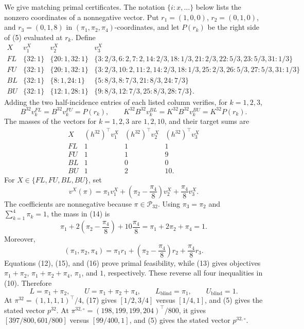 We give matching primal certificates.  The notation \(\{i:x,\ldots\}\) below lists the nonzero coordinates of a nonnegative vector.  Put \(r_1=(1,0,0)\), \(r_2=(0,1,0)\), and \(r_3=(0,1,8)\) in \((\pi_1,\pi_2,\pi_4)\)-coordinates, and let \(P(r_k)\) be the right side of (5) evaluated at \(r_k\).  Define
\[
\begin{array}{c|c|c|l}
X&v_1^X&v_2^X&v_3^X\\\hline
FL&\{32:1\}&\{20:1,32:1\}&
\{3:2/3,6:2,7:2,14:2/3,18:1/3,21:2/3,22:5/3,23:5/3,31:1/3\}\\
FU&\{32:1\}&\{20:1,32:1\}&
\{3:2/3,10:2,11:2,14:2/3,18:1/3,25:2/3,26:5/3,27:5/3,31:1/3\}\\
BL&\{32:1\}&\{8:1,24:1\}&
\{5:8/3,8:7/3,21:8/3,24:7/3\}\\
BU&\{32:1\}&\{12:1,28:1\}&
\{9:8/3,12:7/3,25:8/3,28:7/3\}.
\end{array}
\tag{11}
\]
Adding the two half-incidence entries of each listed column verifies, for \(k=1,2,3\),
\[
B^{32}v_k^{FL}=B^{32}v_k^{FU}=P(r_k),
\qquad
K^{32}B^{32}v_k^{BL}=K^{32}B^{32}v_k^{BU}=K^{32}P(r_k).
\tag{12}
\]
The masses of the vectors for \(k=1,2,3\) are \(1,2,10\), and their target sums are
\[
\begin{array}{c|ccc}
X&(h^{32})^{\top}v_1^X&(h^{32})^{\top}v_2^X&(h^{32})^{\top}v_3^X\\\hline
FL&1&1&1\\
FU&1&1&9\\
BL&1&0&0\\
BU&1&2&10.
\end{array}
\tag{13}
\]
For \(X\in\{FL,FU,BL,BU\}\), set
\[
v^X(\pi)=\pi_1v_1^X+\left(\pi_2-\frac{\pi_4}{8}\right)v_2^X
+\frac{\pi_4}{8}v_3^X.
\tag{14}
\]
The coefficients are nonnegative because \(\pi\in\mathcal P_{32}\).  Using \(\pi_3=\pi_2\) and \(\sum_{k=1}^4\pi_k=1\), the mass in (14) is
\[
\pi_1+2\left(\pi_2-\frac{\pi_4}{8}\right)+10\frac{\pi_4}{8}
=\pi_1+2\pi_2+\pi_4=1.
\tag{15}
\]
Moreover,
\[
(\pi_1,\pi_2,\pi_4)
=\pi_1r_1+\left(\pi_2-\frac{\pi_4}{8}\right)r_2+\frac{\pi_4}{8}r_3.
\tag{16}
\]
Equations (12), (15), and (16) prove primal feasibility, while (13) gives objectives \(\pi_1+\pi_2\), \(\pi_1+\pi_2+\pi_4\), \(\pi_1\), and \(1\), respectively.  These reverse all four inequalities in (10).  Therefore
\[
L=\pi_1+\pi_2,
\qquad
U=\pi_1+\pi_2+\pi_4,
\qquad
L_{\mathrm{blind}}=\pi_1,
\qquad
U_{\mathrm{blind}}=1.
\tag{17}
\]
At \(\pi^{32}=(1,1,1,1)^{\top}/4\), (17) gives \([1/2,3/4]\) versus \([1/4,1]\), and (5) gives the stated vector \(p^{32}\).  At \(\pi^{32,\circ}=(198,199,199,204)^{\top}/800\), it gives \([397/800,601/800]\) versus \([99/400,1]\), and (5) gives the stated vector \(p^{32,\circ}\).

